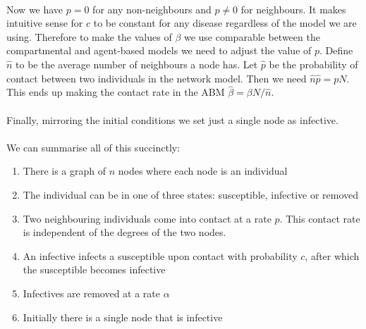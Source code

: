 \\
Now we have $p=0$ for any non-neighbours and $p\neq0$ for neighbours. It makes intuitive sense for $c$ to be constant for any disease regardless of the model we are using. Therefore to make the values of $\beta$ we use comparable between the compartmental and agent-based models we need to adjust the value of $p$. Define $\hat n$ to be the average number of neighbours a node has. Let $\hat p$ be the probability of contact between two individuals in the network model. Then we need $\hat n \hat p = p N$. This ends up making the contact rate in the ABM $\hat\beta=\beta N/\hat n$.\\
\label{mmd}
\\
Finally, mirroring the initial conditions we set just a single node as infective.\\
\\
We can summarise all of this succinctly:
\begin{enumerate}[nosep]
	\item There is a graph of $n$ nodes where each node is an individual
	\item The individual can be in one of three states: susceptible, infective or removed
	\item Two neighbouring individuals come into contact at a rate $p$. This contact rate is independent of the degrees of the two nodes.
	\label{mmd}
	\item An infective infects a susceptible upon contact with probability $c$, after which the susceptible becomes infective
	\item Infectives are removed at a rate $\alpha$
	\item Initially there is a single node that is infective	
\end{enumerate}
